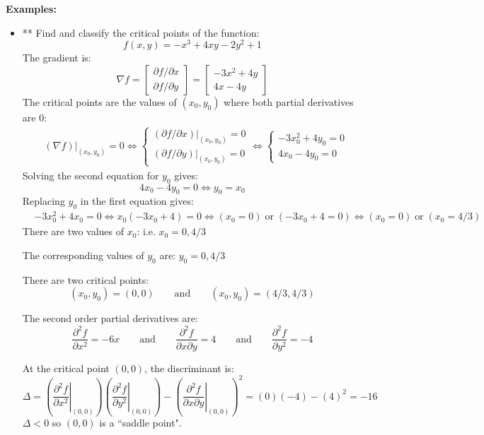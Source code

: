 \documentclass{article}
\begin{document}
\vspace{5mm}

\textbf{Examples:}
\begin{itemize}
\item** Find and classify the critical points of the function:
\[f(x,y) = -x^3 + 4xy - 2y^2 + 1\]
The gradient is:
\[\nabla f = \begin{bmatrix} \partial f/\partial x \\ \partial f/\partial y \end{bmatrix} = \begin{bmatrix} -3x^2 + 4y \\ 4x - 4y \end{bmatrix}\]
The critical points are the values of \((x_0, y_0)\) where both partial derivatives are \(0\):
\begin{align*}
& (\nabla f)\Big|_{(x_0, y_0)} = 0 
\iff \left\{\begin{array}{c} (\partial f/\partial x)|_{(x_0, y_0)} = 0 \\ (\partial f/\partial y)|_{(x_0, y_0)} = 0 \end{array}\right. 
\iff \left\{\begin{array}{c} -3x_0^2 + 4y_0 = 0 \\ 4x_0 - 4y_0 = 0 \end{array}\right. 
\end{align*}
Solving the second equation for \(y_0\) gives: 
\[4x_0 - 4y_0 = 0 \iff y_0 = x_0\]
Replacing \(y_0\) in the first equation gives:
\begin{align*} 
& -3x_0^2 + 4x_0 = 0 
\iff x_0(-3x_0 + 4) = 0 
\iff (x_0 = 0) \;\text{or}\; (-3x_0 + 4 = 0) 
\iff (x_0 = 0) \;\text{or}\; (x_0 = 4/3) 
\end{align*}  
There are two values of \(x_0\): i.e. \(x_0 = 0, 4/3\)

The corresponding values of \(y_0\) are: \(y_0 = 0, 4/3\) 

There are two critical points:
\[(x_0, y_0) = (0, 0) \quad\quad\text{and}\quad\quad (x_0, y_0) = (4/3, 4/3)\]

The second order partial derivatives are:
\[\frac{\partial^2 f}{\partial x^2} = -6x \quad\quad\text{and}\quad\quad \frac{\partial^2 f}{\partial x \partial y} = 4 \quad\quad\text{and}\quad\quad \frac{\partial^2 f}{\partial y^2} = -4\]

At the critical point \((0, 0)\), the discriminant is:
\[\Delta = \left(\left.\frac{\partial^2 f}{\partial x^2}\right|_{(0,0)}\right)\left(\left.\frac{\partial^2 f}{\partial y^2}\right|_{(0,0)}\right) - \left(\left.\frac{\partial^2 f}{\partial x \partial y}\right|_{(0,0)}\right)^2 = (0)(-4) - (4)^2 = -16\]
\(\Delta < 0\) so \((0, 0)\) is a ``saddle point".


\end{itemize}
\end{document}
